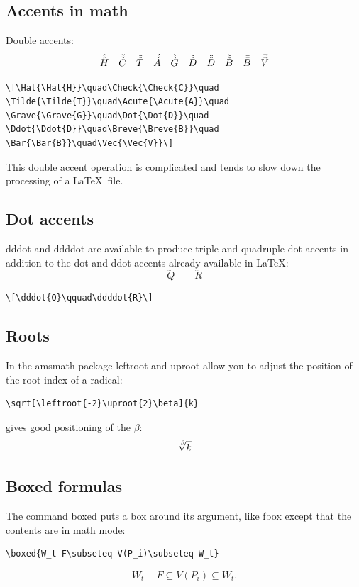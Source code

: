 \documentclass{article}
\newcommand{\ntt}{\normalfont\ttfamily}
\newcommand{\cn}[1]{{\protect\ntt\bslash#1}}
\newcommand{\pkg}[1]{{\protect\ntt#1}}
\theoremstyle{definition}
\theoremstyle{remark}
\begin{document}
\subsection{Accents in math}

Double accents:
\[\Hat{\Hat{H}}\quad\Check{\Check{C}}\quad
\Tilde{\Tilde{T}}\quad\Acute{\Acute{A}}\quad
\Grave{\Grave{G}}\quad\Dot{\Dot{D}}\quad
\Ddot{\Ddot{D}}\quad\Breve{\Breve{B}}\quad
\Bar{\Bar{B}}\quad\Vec{\Vec{V}}\]
\begin{verbatim}
\[\Hat{\Hat{H}}\quad\Check{\Check{C}}\quad
\Tilde{\Tilde{T}}\quad\Acute{\Acute{A}}\quad
\Grave{\Grave{G}}\quad\Dot{\Dot{D}}\quad
\Ddot{\Ddot{D}}\quad\Breve{\Breve{B}}\quad
\Bar{\Bar{B}}\quad\Vec{\Vec{V}}\]
\end{verbatim}
This double accent operation is complicated
and tends to slow down the processing of a \LaTeX\ file.


\subsection{Dot accents}
\cn{dddot} and \cn{ddddot} are available to
produce triple and quadruple dot accents
in addition to the \cn{dot} and \cn{ddot} accents already available
in \LaTeX:
\[\dddot{Q}\qquad\ddddot{R}\]
\begin{verbatim}
\[\dddot{Q}\qquad\ddddot{R}\]
\end{verbatim}

\subsection{Roots}

In the \pkg{amsmath} package \cn{leftroot} and \cn{uproot} allow you to adjust
the position of the root index of a radical:
\begin{verbatim}
\sqrt[\leftroot{-2}\uproot{2}\beta]{k}
\end{verbatim}
gives good positioning of the $\beta$:
\[\sqrt[\leftroot{-2}\uproot{2}\beta]{k}\]

\subsection{Boxed formulas} The command \cn{boxed} puts a box around its
argument, like \cn{fbox} except that the contents are in math mode:
\begin{verbatim}
\boxed{W_t-F\subseteq V(P_i)\subseteq W_t}
\end{verbatim}
\[\boxed{W_t-F\subseteq V(P_i)\subseteq W_t}.\]
\end{document}
